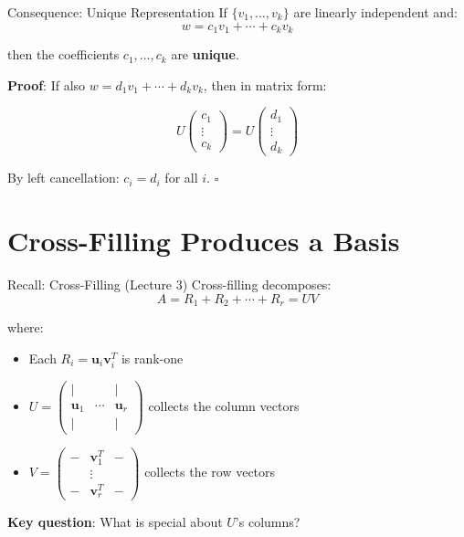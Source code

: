 \documentclass[10pt]{beamer}
\theoremstyle{definition}
\newcommand{\x}[1]{\alert{\textbf{#1}}}
\begin{document}
\begin{frame}{Consequence: Unique Representation}
If $\{v_1, \ldots, v_k\}$ are linearly independent and:
$$w = c_1v_1 + \cdots + c_kv_k$$

then the coefficients $c_1, \ldots, c_k$ are \x{unique}.

\vfill
\textbf{Proof}: If also $w = d_1v_1 + \cdots + d_kv_k$, then in matrix form:

$$U\begin{pmatrix} c_1 \\ \vdots \\ c_k \end{pmatrix} = U\begin{pmatrix} d_1 \\ \vdots \\ d_k \end{pmatrix}$$

By left cancellation: $c_i = d_i$ for all $i$. $\square$
\end{frame}

\section{Cross-Filling Produces a Basis}

\begin{frame}{Recall: Cross-Filling (Lecture 3)}
Cross-filling decomposes:
$$A = R_1 + R_2 + \cdots + R_r = UV$$

where:
\begin{itemize}
\item Each $R_i = \mathbf{u}_i\mathbf{v}_i^T$ is rank-one
\item $U = \begin{pmatrix} | & & | \\ \mathbf{u}_1 & \cdots & \mathbf{u}_r \\ | & & | \end{pmatrix}$ collects the column vectors
\item $V = \begin{pmatrix} - & \mathbf{v}_1^T & - \\ & \vdots & \\ - & \mathbf{v}_r^T & - \end{pmatrix}$ collects the row vectors
\end{itemize}

\vfill
\x{Key question}: What is special about $U$'s columns?
\end{frame}
\end{document}
